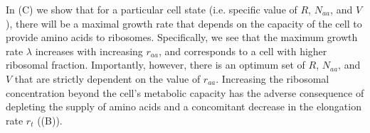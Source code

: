 In (C) we show that for a particular cell state (i.e.
specific value of $R$, $N_{aa}$, and $V$), there will be a maximal growth rate
that depends on the capacity of the cell to provide amino acids to ribosomes.
Specifically, we see that the maximum growth rate $\lambda$ increases with
increasing $r_{aa}$, and corresponds to a cell with higher ribosomal fraction.
Importantly, however, there is an optimum  set of $R$, $N_{aa}$, and $V$ that
are strictly dependent on the value of $r_{aa}$. Increasing the ribosomal
concentration beyond the cell's metabolic capacity has the adverse consequence
of depleting the supply of amino acids and a concomitant decrease in the
elongation rate $r_t$ ((B)).


\begin{figure*}
    \begin{fullwidth}
    \end{fullwidth}
\end{figure*}

